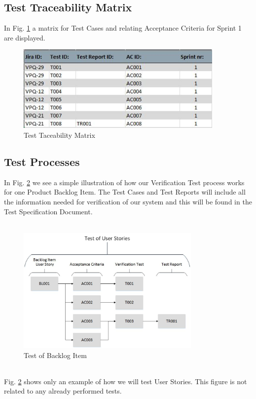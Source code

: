 \subsection{Test Traceability Matrix}
In Fig. \ref{fig:matrix} a matrix for Test Cases and relating Acceptance Criteria for Sprint 1 are displayed.

\begin{figure}[h]
    \centering
        \includegraphics[width=0.9\textwidth]{VAPIQ-PICTURES/Capture}
        \caption{Test Taceability Matrix}
        \label{fig:matrix}
\end{figure}

\newpage

\subsection{Test Processes}
In Fig. \ref{fig:testsetup} we see a simple illustration of how our Verification Test process works for one Product Backlog Item. The Test Cases and Test Reports will include all the information needed for verification of our system and this will be found in the Test Specification Document.\\
\\
\begin{figure}[h]
    \centering
        \includegraphics[width=0.8\textwidth]{VAPIQ-PICTURES/testdocbild}
        \caption{Test of Backlog Item}
        \label{fig:testsetup}
\end{figure}
\\
Fig. \ref{fig:testsetup} shows only an example of how we will test User Stories. This figure is not related to any already performed tests.\\


